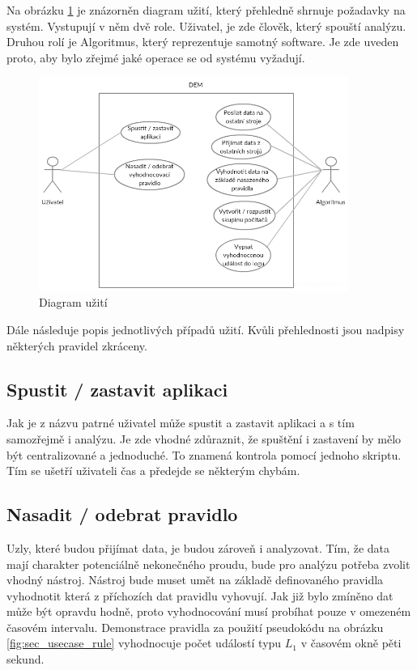 \documentclass[
  digital, %
  table,   %
  nolof,     %
  nolot,     %
  oneside, %
  nocover,
  monochrome,
  12pt
]{fithesis3}
\begin{document}
Na obrázku \ref{fig:usecase} je znázorněn diagram užití, který přehledně shrnuje požadavky na systém. Vystupují v něm dvě role. Uživatel, je zde člověk, který spouští analýzu. Druhou rolí je Algoritmus, který reprezentuje samotný software. Je zde uveden proto, aby bylo zřejmé jaké operace se od systému vyžadují.

\begin{figure}[H]
	\centering
    \includegraphics[width=0.9\textwidth, height=0.45\textheight]{images/usecase.png}
    \caption{Diagram užití}
    \label{fig:usecase}
\end{figure}

Dále následuje popis jednotlivých případů užití. Kvůli přehlednosti jsou nadpisy některých pravidel zkráceny.

\subsection*{Spustit / zastavit aplikaci}
Jak je z názvu patrné uživatel může spustit a zastavit aplikaci a s tím samozřejmě i analýzu. Je zde vhodné zdůraznit, že spuštění i zastavení by mělo být centralizované a jednoduché. To znamená kontrola pomocí jednoho skriptu. Tím se ušetří uživateli čas a předejde se některým chybám.

\subsection*{Nasadit / odebrat pravidlo}
\label{sec:usecase_rule}
Uzly, které budou přijímat data, je budou zároveň i analyzovat. Tím, že data mají charakter potenciálně nekonečného proudu, bude pro analýzu potřeba zvolit vhodný nástroj. Nástroj bude muset umět na základě definovaného pravidla vyhodnotit která z příchozích dat pravidlu vyhovují. Jak již bylo zmíněno dat může být opravdu hodně, proto vyhodnocování musí probíhat pouze v omezeném časovém intervalu. Demonstrace pravidla za použití pseudokódu na obrázku \ref{fig:sec_usecase_rule} vyhodnocuje počet událostí typu \textit{$L_1$} v časovém okně pěti sekund.
\end{document}
